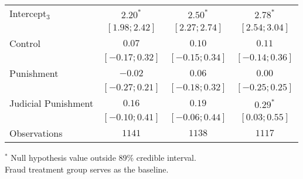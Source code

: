 \begin{table}[h]
\begin{center}
\begin{threeparttable}
\begin{tabular}{l c c c}
Intercept$_3$       & $2.20^{*}$        & $2.50^{*}$        & $2.78^{*}$        \\
                    & $ [ 1.98;  2.42]$ & $ [ 2.27;  2.74]$ & $ [ 2.54;  3.04]$ \\
Control             & $0.07$            & $0.10$            & $0.11$            \\
                    & $ [-0.17;  0.32]$ & $ [-0.15;  0.34]$ & $ [-0.14;  0.36]$ \\
Punishment          & $-0.02$           & $0.06$            & $0.00$            \\
                    & $ [-0.27;  0.21]$ & $ [-0.18;  0.32]$ & $ [-0.25;  0.25]$ \\
Judicial Punishment & $0.16$            & $0.19$            & $0.29^{*}$        \\
                    & $ [-0.10;  0.41]$ & $ [-0.06;  0.44]$ & $ [ 0.03;  0.55]$ \\
\hline
Observations        & $1141$            & $1138$            & $1117$            \\
\hline
\end{tabular}
\begin{tablenotes}[flushleft]
\scriptsize{$^*$ Null hypothesis value outside 89\% credible interval.  \\
Fraud treatment group serves as the baseline.}
\end{tablenotes}
\end{threeparttable}
\label{table:coefficients}
\end{center}
\end{table}
